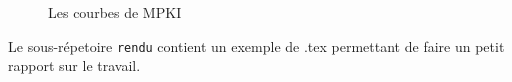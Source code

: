 \documentclass[a4paper]{article}
\begin{document}
\begin{figure}[htb]
{      \label{plot2}
      }
      \caption{\label{results}Les courbes de MPKI}
      \end{figure}

Le sous-répetoire \verb+rendu+ contient un exemple de .tex permettant de faire un petit rapport sur le travail.
\end{document}
